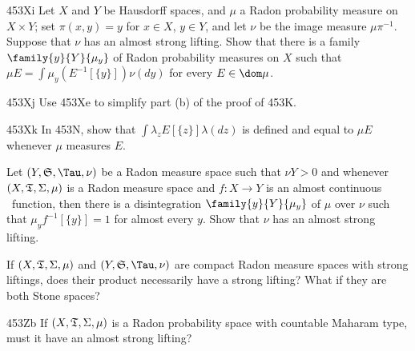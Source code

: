 {\spheader 453Xi Let $X$ and $Y$ be Hausdorff spaces, and $\mu$ a Radon 
probability measure on $X\times Y$;  set $\pi(x,y)=y$ for $x\in X$, 
$y\in Y$, and let $\nu$ be the image measure $\mu\pi^{-1}$.   Suppose 
that $\nu$ has an almost strong lifting.   Show 
that there is a family $\family{y}{Y}{\mu_y}$ of Radon probability 
measures on $X$ such that $\mu E=\int\mu_y(E^{-1}[\{y\}])\nu(dy)$ for 
every $E\in\dom\mu$. 
      
\spheader 453Xj Use 453Xe to simplify part (b) of the proof of 453K. 
      
\spheader 453Xk In 453N, show that $\int\lambda_zE[\{z\}]\lambda(dz)$ is 
defined and equal to $\mu E$ whenever $\mu$ measures $E$. 
      
      
Let $(Y,\frak S,\Tau,\nu)$ be a Radon measure space such 
that $\nu Y>0$ and whenever $(X,\frak T,\Sigma,\mu)$ is a Radon measure 
space and $f:X\to Y$ is an almost continuous \imp\ function, then there 
is a disintegration $\family{y}{Y}{\mu_y}$ of $\mu$ over $\nu$ such that 
$\mu_yf^{-1}[\{y\}]=1$ for almost every $y$.   Show that $\nu$ has an 
almost strong lifting.    
      
If $(X,\frak T,\Sigma,\mu)$ and $(Y,\frak S,\Tau,\nu)$ are compact Radon 
measure spaces with strong liftings, does their product necessarily have 
a strong lifting?   What if they are both Stone spaces? 
      
\spheader 453Zb If $(X,\frak T,\Sigma,\mu)$ is a Radon probability space 
with countable Maharam type, must it have an almost strong lifting? 
}%
      
